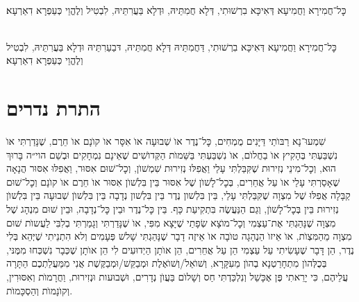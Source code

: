 \documentclass[twoside, openany, parskip=half, 11pt]{book}
\begin{document}
\\
כׇּל־חֲמִירָא וַחֲמִיעָא דְּאִיכָּא בִרְשׁוּתִי, דְּלָא חֲמִתֵּיהּ, וּדְלָא בַּעֲרִתֵּיהּ, לִבְטִיל וְלֶהֱוֵי כְּעַפְרָא דִאַרְעָא׃


\\
כׇּל־חֲמִירָא וַחֲמִיעָא דְּאִיכָּא בִרְשׁוּתִי, דַּחֲמִתֵּיהּ דְּלָא חֲמִתֵּיהּ, דּבַעַרִתֵּיהּ וּדְלָא בַּעֲרִתֵּיהּ, לִבְטִיל וְלֶהֱוֵי כְּעַפְרָא דִאַרְעָא׃



\chapter[התרת נדרים]{ התרת נדרים }


שִׁמְעוּ־נָא רַבּוׂתַי דַּיָּנִים מֻמְחִים, כׇּל־נֶדֶר אוׂ שְׁבוּעָה אוׂ אִסָּר אוׂ קוׂנָם אוׂ חֵרֶם, שֶׁנָּדַרְתִּי אוׂ נִשְׁבַּעְתִּי בְּהָקִיץ אוׂ בַחֲלוׂם, אוׂ נִשְׁבַּעְתִּי בַּשֵּׁמוׂת הַקְּדוׂשִׁים שֶׁאֵינָם נִמְחָקִים וּבְשֵׁם הוי״ה בָּרוּךְ הוּא, וְכׇל־מִינֵי נְזִירוּת שֶׁקִּבַּלְתִּי עָלַי וַאֲפִלּוּ נְזִירוּת שִׁמְשׁוׂן, וְכׇל־שׁוּם אִסּוּר, וַאֲפִלּוּ אִסּוּר הֲנָאָה שֶׁאָסַרְתִּי עָלַי אוׂ עַל אֲחֵרִים, בְּכׇל־לָשׁוׂן שֶׁל אִסּוּר בֵּין בִּלְשׁוׂן אִסּוּר אוׂ חֵרֶם אוׂ קוׂנָם וְכׇל־שׁוּם קַבָּלָה אֲפִלּוּ שֶׁל מִצְוָה שֶׁקִּבַּלְתִּי עָלַי, בֵּין בִּלְשׁון נֶדֶר בֵּין בִּלְשׁון נְדָבָה בֵּין בִּלְשׁוׂן שְׁבוּעָה בֵּין בִּלְשׁוׂן נְזִירוּת בֵּין בְּכׇל־לָשׁוׂן, וְגַם הַנַּעֲשֶׂה בִּתְקִיעַת כָּף. בֵּין כׇּל־נֶדֶר וּבֵין כׇּל־נְדָבָה, וּבֵין שׁוּם מִנְהָג שֶׁל מִצְוָה שֶׁנָּהַגְתִּי אֶת־עַצְמִי וְכׇל־מוׂצָא שְׂפָתַי שֶׁיָּצָא מִפִּי, אוׂ שֶׁנָּדַרְתִּי וְגָמַרְתִּי בְלִבִּי לַעֲשוׂת שׁוּם מִצְוָה מֵהַמִּצְוׂת, אוׂ אֵיזוׂ הַנְהָגָה טוׂבָה אוׂ אֵיזֶה דָבָר שֶׁנָּהַגְתִּי שָׁלשׁ פְּעָמִים וְלא הִתְנֵיתִי שֶׁיְּהֵא בְּלִי נֶדֶר, הֵן דָּבָר שֶׁעָשִׂיתִי עַל עַצְמִי הֵן עַל אֲחֵרִים, הֵן אוׂתָן הַיְדוּעִים לִי הֵן אוׂתָן שֶׁכְּבָר נִשְׁכְּחוּ מִמֶּנּי, בְּכֻלְּהוׂן מִתְחָרַטְנָא בְהוׂן מֵעִקָּרָא, וְשׁוׂאֵל/וְשׁוׂאֶלֶת וּמְבַקֵּשׁ/וּמְבַקֶּשֶׁת אֲנִי מִמַּעֲלַתְכֶם הַתָּרָה עֲלֵיהֶם, כִּי יָרֵאתִי פֶּן אֶכָּשֵׁל וְנִלְכַּדְתִּי חַס וְשָׁלוׂם בַּעֲוׂן נְדָרִים, וּשְׁבוּעות וּנְזִירוּת, וַחֲרָמוׂת וְאִסּוּרִין, וְקוׂנָמוׂת וְהַסְכָּמוׂת.
\end{document}
